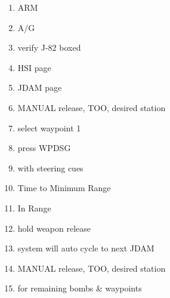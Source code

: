 \documentclass[fontHelvetica, widesubsec]{TechCheck}
\begin{document}
	\begin{enumerate}
		\item {}\dotfill ARM
		\item {}\dotfill A/G
		\item {}\dotfill verify J-82 boxed
		\item {}\dotfill HSI page
		\item {}\dotfill JDAM page
		\item {}\dotfill MANUAL release, TOO, desired station
		\item {}\dotfill select waypoint 1
		\item {}\dotfill press WPDSG
		\item {}\dotfill with steering cues
		\item {}\dotfill Time to Minimum Range
		\item {}\dotfill In Range
		\item {}\dotfill hold weapon release
		\item {}\dotfill system will auto cycle to next JDAM
		\item {}\dotfill MANUAL release, TOO, desired station
		\item {}\dotfill for remaining bombs \& waypoints
	\end{enumerate}
\end{document}
